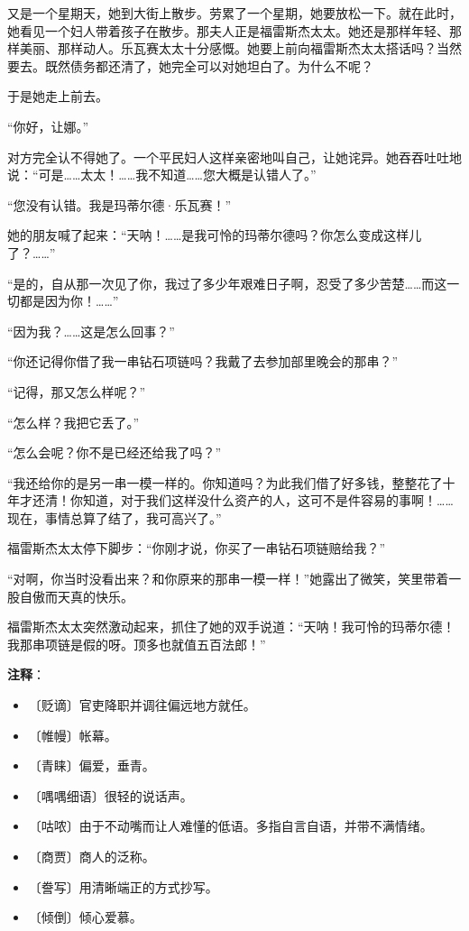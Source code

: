 \documentclass[12pt,UTF-8,openany]{ctexbook}
\begin{document}
\begin{normalsize}
    又是一个星期天，她到大街上散步。劳累了一个星期，她要放松一下。就在此时，她看见一个妇人带着孩子在散步。那夫人正是福雷斯杰太太。她还是那样年轻、那样美丽、那样动人。乐瓦赛太太十分感慨。她要上前向福雷斯杰太太搭话吗？当然要去。既然债务都还清了，她完全可以对她坦白了。为什么不呢？
    
    于是她走上前去。
    
    “你好，让娜。”
    
    对方完全认不得她了。一个平民妇人这样亲密地叫自己，让她诧异。她吞吞吐吐地说：“可是……太太！……我不知道……您大概是认错人了。”
    
    “您没有认错。我是玛蒂尔德·乐瓦赛！”
    
    她的朋友喊了起来：“天呐！……是我可怜的玛蒂尔德吗？你怎么变成这样儿了？……”
    
    “是的，自从那一次见了你，我过了多少年艰难日子啊，忍受了多少苦楚……而这一切都是因为你！……”
    
    “因为我？……这是怎么回事？”
    
    “你还记得你借了我一串钻石项链吗？我戴了去参加部里晚会的那串？”
    
    “记得，那又怎么样呢？”
    
    “怎么样？我把它丢了。”
    
    “怎么会呢？你不是已经还给我了吗？”
    
    “我还给你的是另一串一模一样的。你知道吗？为此我们借了好多钱，整整花了十年才还清！你知道，对于我们这样没什么资产的人，这可不是件容易的事啊！……现在，事情总算了结了，我可高兴了。”
    
    福雷斯杰太太停下脚步：“你刚才说，你买了一串钻石项链赔给我？”
    
    “对啊，你当时没看出来？和你原来的那串一模一样！”她露出了微笑，笑里带着一股自傲而天真的快乐。
    
    福雷斯杰太太突然激动起来，抓住了她的双手说道：“天呐！我可怜的玛蒂尔德！我那串项链是假的呀。顶多也就值五百法郎！”
    
\end{normalsize}


\newpage

\textbf{注释}：

\vspace{-1em}

\begin{itemize}
    \setlength\itemsep{-0.2em}
    \item 〔贬谪〕官吏降职并调往偏远地方就任。
    \item 〔帷幔〕帐幕。
    \item 〔青睐〕偏爱，垂青。
    \item 〔喁喁细语〕很轻的说话声。
    \item 〔咕哝〕由于不动嘴而让人难懂的低语。多指自言自语，并带不满情绪。
    \item 〔商贾〕商人的泛称。
    \item 〔誊写〕用清晰端正的方式抄写。
    \item 〔倾倒〕倾心爱慕。
\end{itemize}
\end{document}
